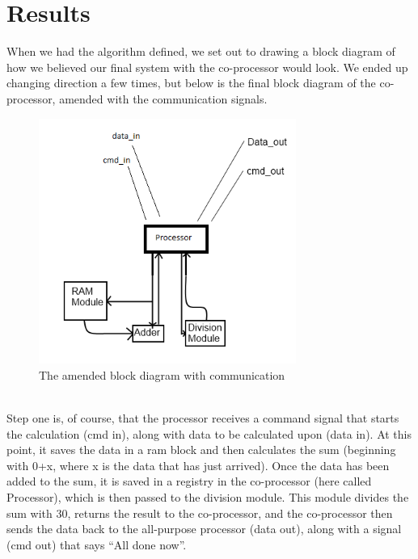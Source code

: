 \documentclass[12pt,a4paper]{article}
\begin{document}
\section{Results}
	When we had the algorithm defined, we set out to drawing a block diagram of how we believed our final system with the co-processor would look. We ended up changing direction a few times, but below is the final block diagram of the co-processor, amended with the communication signals.\\
	\begin{figure}[h!]
	  \centering
	    \includegraphics[width=0.75\textwidth]{Block_diagram2.png}
	  \caption{The amended block diagram with communication }
	\end{figure}
	\\
	Step one is, of course, that the processor receives a command signal that starts the calculation (cmd in), along with data to be calculated upon (data in). At this point, it saves the data in a ram block and then calculates the sum (beginning with 0+x, where x is the data that has just arrived). Once the data has been added to the sum, it is saved in a registry in the co-processor (here called Processor), which is then passed to the division module. This module divides the sum with 30, returns the result to the co-processor, and the co-processor then sends the data back to the all-purpose processor (data out), along with a signal (cmd out) that says ``All done now''.
\end{document}
